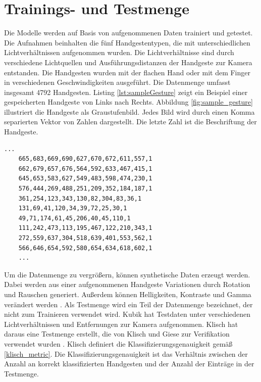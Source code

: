 \section{Trainings- und Testmenge}
\label{sec:synthetischeDaten}
\label{sec:testdaten}
Die Modelle werden auf Basis von aufgenommenen Daten trainiert und getestet. Die Aufnahmen beinhalten die fünf Handgestentypen, die mit unterschiedlichen Lichtverhältnissen aufgenommen wurden. Die Lichtverhältnisse
sind durch verschiedene Lichtquellen und Ausführungsdistanzen der Handgeste zur Kamera entstanden. Die Handgesten wurden mit der flachen Hand oder mit dem Finger in verschiedenen Geschwindigkeiten ausgeführt.
Die Datenmenge umfasst insgesamt 4792 Handgesten.
\newline
\newline
Listing \ref{lst:sampleGesture} zeigt ein Beispiel einer gespeicherten Handgeste von Links nach Rechts. Abbildung \ref{fig:sample_gesture} illustriert die Handgeste als Graustufenbild.
Jedes Bild wird durch einen Komma separierten Vektor von Zahlen dargestellt. Die letzte Zahl ist die Beschriftung der Handgeste.
\begin{lstlisting}[label=lst:sampleGesture,caption={Beispiel einer gespeicherten Handgeste von Links nach Rechts.}]
    ...
    665,683,669,690,627,670,672,611,557,1
    662,679,657,676,564,592,633,467,415,1
    645,653,583,627,549,483,598,474,230,1
    576,444,269,488,251,209,352,184,187,1
    361,254,123,343,130,82,304,83,36,1
    131,69,41,120,34,39,72,25,30,1
    49,71,174,61,45,206,40,45,110,1
    111,242,473,113,195,467,122,210,343,1
    272,559,637,304,518,639,401,553,562,1
    566,646,654,592,580,654,634,618,602,1
    ...
\end{lstlisting}
Um die Datenmenge zu vergrößern, können synthetische Daten erzeugt werden. Dabei werden aus einer aufgenommenen Handgeste Variationen durch Rotation und Rauschen generiert. Außerdem können Helligkeiten,
Kontraste und Gamma verändert werden \cite{venzkeArticle}.
\newline
\newline
Als Testmenge wird ein Teil der Datenmenge bezeichnet, der nicht zum Trainieren verwendet wird. Kubik hat Testdaten unter verschiedenen Lichtverhältnissen und Entfernungen zur Kamera aufgenommen. Klisch hat
daraus eine Testmenge erstellt, die von Klisch und Giese zur Verifikation verwendet wurden \cite{klischThesis, gieseThesis}. Klisch definiert die Klassifizierungsgenauigkeit gemäß \ref{klisch_metric}. Die
Klassifizierungsgenauigkeit ist das Verhältnis zwischen der Anzahl an korrekt klassifizierten Handgesten und der Anzahl der Einträge in der Testmenge.

